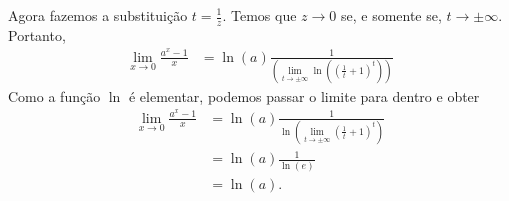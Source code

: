 \begin{itemize}
	Agora fazemos a substituição $t=\frac{1}{z}$. Temos que $z\to 0$ se, e somente se, $t\to\pm\infty$. Portanto,
	\begin{align*}
	    \lim_{x\to 0}\frac{a^x-1}{x}
	        &=\ln(a)\frac{1}{\left(\displaystyle\lim_{t\to\pm\infty}\ln\left(\left(\frac{1}{t}+1\right)^{t}\right)\right)}
	\end{align*}
	Como a função $\ln$ é elementar, podemos passar o limite para dentro e obter
	\begin{align*}
	    \lim_{x\to 0}\frac{a^x-1}{x}
	        &=\ln(a)\frac{1}{\displaystyle\ln\left(\lim_{t\to\pm\infty}\left(\frac{1}{t}+1\right)^{t}\right)}\\
	        &=\ln(a)\frac{1}{\ln(e)}\\
	        &=\ln(a).
	\end{align*}
\end{itemize}